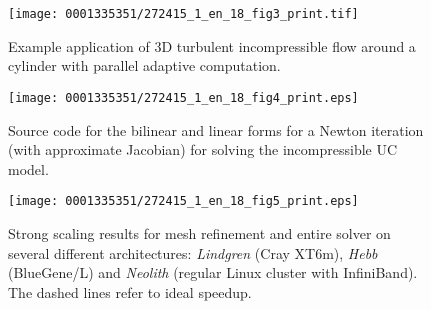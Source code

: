 \begin{figure}[!b]
  \centering
  \texttt{[image: 0001335351/272415\_1\_en\_18\_fig3\_print.tif]}
  \caption{Example application of 3D turbulent incompressible flow around
    a cylinder with parallel adaptive computation.}
  \label{fig:parcyl3D}
\end{figure}

\begin{figure}[!t]
\bwfig
\texttt{[image: 0001335351/272415\_1\_en\_18\_fig4\_print.eps]}
\caption{Source code for the bilinear and linear forms for a Newton
  iteration (with approximate Jacobian) for solving the incompressible
  UC model.}\label{code:FFC_UC}\vspace*{-4pt}
\end{figure}

\begin{figure}[!t]
\centering
\texttt{[image: 0001335351/272415\_1\_en\_18\_fig5\_print.eps]}
\caption{\label{fig:hoffman-2:sp} Strong scaling results for mesh
refinement and entire solver on several different architectures:
\textit{Lindgren} (Cray XT6m), \textit{Hebb} (BlueGene/L) and
\textit{Neolith} (regular Linux cluster with InfiniBand). The
dashed lines refer to ideal speedup.}
\end{figure}


